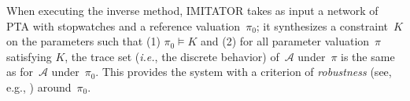 \documentclass[a4paper,11pt]{report}
\newcommand{\A}{\mathcal{A}}
\newcommand{\Ko}{K}
\newcommand{\pio}{\pi_0}
\newcommand{\piprime}{\pi}
\newcommand{\hytech}{{\sc HyTech}}
\newcommand{\imitator}{\textsf{IMITATOR}}
\newcommand{\ie}{\textcolor{colorok}{\textit{i.e.}, }}
\begin{document}
When executing the inverse method, \imitator{} takes as input a network of PTA with stopwatches
and a reference valuation~$\pio$; it synthesizes a constraint~$\Ko$ on the parameters such that (1) $\pio \models \Ko$ and (2) for all parameter valuation~$\piprime$ satisfying $\Ko$, the trace set (\ie{} the discrete behavior) of~$\A$ under~$\piprime$ is the same as for~$\A$ under~$\pio$.
This provides the system with a criterion of \emph{robustness} (see, e.g., \cite{Markey11})
around~$\pio$.


\end{document}
